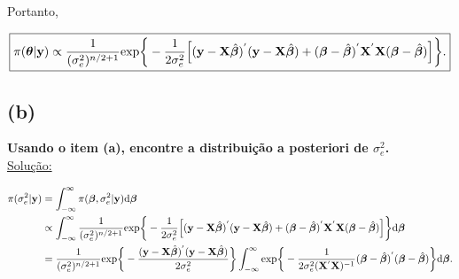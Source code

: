 \documentclass[12pt, oldfontcommands]{article}\usepackage[]{graphicx}\usepackage[]{color}
\begin{document}
Portanto,

\[ \boxed{\pi(\bm{\theta} | \mathbf{y}) \propto
    \frac{1}{(\sigma_{e}^{2})^{n/2 + 1}}
    {\rm exp}\bigg\{-\frac{1}{2\sigma_{e}^{2}}
    \Big[(\mathbf{y} - \mathbf{X} \hat{\bm{\beta}})^{'}
         (\mathbf{y} - \mathbf{X} \hat{\bm{\beta}})
         + (\bm{\beta} - \hat{\bm{\beta}})^{'}
         \mathbf{X}^{'}\mathbf{X}(\bm{\beta} - \hat{\bm{\beta}})
    \Big]\bigg\}.} \]

\subsection*{(b)} 

\textbf{Usando o item (a), encontre a distribuição a posteriori de
        \(\sigma_{e}^{2}\).} \\

\underline{Solução:}

\begin{align*}
 \pi(\sigma_{e}^{2}|\mathbf{y}) & =
 \int_{-\infty}^{\infty} \pi(\bm{\beta}, \sigma_{e}^{2}|\mathbf{y})
 {\rm d}\bm{\beta} \\ & \propto
 \int_{-\infty}^{\infty} \frac{1}{(\sigma_{e}^{2})^{n/2 + 1}}
 {\rm exp}\bigg\{-\frac{1}{2\sigma_{e}^{2}}
 \Big[(\mathbf{y} - \mathbf{X} \hat{\bm{\beta}})^{'}
 (\mathbf{y} - \mathbf{X} \hat{\bm{\beta}})
 + (\bm{\beta} - \hat{\bm{\beta}})^{'}
 \mathbf{X}^{'}\mathbf{X}(\bm{\beta} - \hat{\bm{\beta}}) \Big]\bigg\}
 {\rm d}\bm{\beta} \\ & =
 \frac{1}{(\sigma_{e}^{2})^{n/2 + 1}}
 {\rm exp}\bigg\{-\frac{(\mathbf{y} - \mathbf{X} \hat{\bm{\beta}})^{'}
 (\mathbf{y} - \mathbf{X} \hat{\bm{\beta}})}{2\sigma_{e}^{2}}\bigg\}
 \int_{-\infty}^{\infty} {\rm exp}\bigg\{
 -\frac{1}{2\sigma_{e}^{2}(\mathbf{X}^{'}\mathbf{X})^{-1}}
 (\bm{\beta} - \hat{\bm{\beta}})^{'}
 (\bm{\beta} - \hat{\bm{\beta}})\bigg\}{\rm d}\bm{\beta}.
\end{align*}
\end{document}
